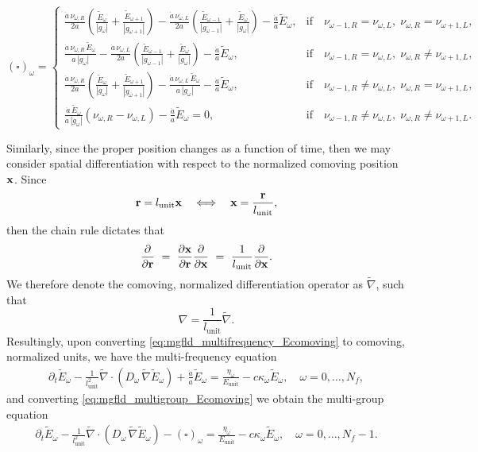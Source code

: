 \documentclass[10pt]{article}
\renewcommand{\(}{\left(}
\renewcommand{\)}{\right)}
\newcommand{\xvec}{{\bf x}}
\newcommand{\rvec}{{\bf r}}
\newcommand{\adot}{\dot{a}}
\newcommand{\Lunit}{l_{\text{unit}}}
\newcommand{\Eunit}{E_{\text{unit}}}
\newcommand{\tE}{\tilde{E}}
\newcommand{\tnabla}{\tilde{\nabla}}
\begin{document}
\begin{equation}
\label{eq:square_omega}
  (\square)_{\omega} = \begin{cases}
     \frac{\adot\, \nu_{\omega,R}}{2a}\left(\frac{\tE_{\omega}}{|g_{\omega}|} + \frac{\tE_{\omega+1}}{|g_{\omega+1}|}\right) -
      \frac{\adot\, \nu_{\omega,L}}{2a}\left(\frac{\tE_{\omega-1}}{|g_{\omega-1}|}+\frac{\tE_{\omega}}{|g_{\omega}|}\right) -
      \frac{\adot}{a}\tE_{\omega},&
      \text{if}\quad \nu_{\omega-1,R}=\nu_{\omega,L},\; \nu_{\omega,R}=\nu_{\omega+1,L},\\
     \frac{\adot\, \nu_{\omega,R}\, \tE_{\omega}}{a\, |g_{\omega}|} -
      \frac{\adot\, \nu_{\omega,L}}{2a}\left(\frac{\tE_{\omega-1}}{|g_{\omega-1}|}+\frac{\tE_{\omega}}{|g_{\omega}|}\right) -
      \frac{\adot}{a}\tE_{\omega},&
      \text{if}\quad \nu_{\omega-1,R}=\nu_{\omega,L},\; \nu_{\omega,R}\ne\nu_{\omega+1,L},\\
     \frac{\adot\, \nu_{\omega,R}}{2a}\left(\frac{\tE_{\omega}}{|g_{\omega}|} + \frac{\tE_{\omega+1}}{|g_{\omega+1}|}\right) -
      \frac{\adot\, \nu_{\omega,L}\, \tE_{\omega}}{a\, |g_{\omega}|} -
      \frac{\adot}{a}\tE_{\omega},&
      \text{if}\quad \nu_{\omega-1,R}\ne\nu_{\omega,L},\; \nu_{\omega,R}=\nu_{\omega+1,L},\\
     \frac{\adot\, \tE_{\omega}}{a\, |g_{\omega}|}\left(\nu_{\omega,R} - \nu_{\omega,L}\right) -
      \frac{\adot}{a}\tE_{\omega} = 0,&
      \text{if}\quad \nu_{\omega-1,R}\ne\nu_{\omega,L},\; \nu_{\omega,R}\ne\nu_{\omega+1,L}.
  \end{cases}
\end{equation}


Similarly, since the proper position changes as a function of time,
then we may consider spatial differentiation with respect to the
normalized comoving position $\xvec$.  Since 
\[
   \rvec = \Lunit \xvec \quad\Longleftrightarrow\quad
   \xvec = \frac{\rvec}{\Lunit},
\]
then the chain rule dictates that
\[
   \frac{\partial}{\partial \rvec} \ = \
   \frac{\partial \xvec}{\partial \rvec}
   \frac{\partial}{\partial \xvec} \ = \
   \frac{1}{\Lunit}\frac{\partial}{\partial \xvec}.
\]
We therefore denote the comoving, normalized differentiation operator
as $\tnabla$, such that 
\[
   \nabla = \frac{1}{\Lunit}\tnabla.
\]
Resultingly, upon converting \eqref{eq:mgfld_multifrequency_Ecomoving}
to comoving, normalized units, we have the multi-frequency equation
\begin{align}
  \label{eq:mgfld_multifrequency_comoving}
  \partial_{t} \tE_{\omega} - \frac{1}{\Lunit^2}\tnabla\cdot\(D_{\omega}\,\tnabla \tE_{\omega}\) + \frac{\adot}{a}\tE_{\omega}
    = \frac{\eta_{\omega}}{\Eunit} - c\kappa_{\omega} \tE_{\omega}, \quad \omega=0,\ldots,N_f,
\end{align}
and converting \eqref{eq:mgfld_multigroup_Ecomoving} we obtain the
multi-group equation 
\begin{align}
  \label{eq:mgfld_multigroup_comoving}
  \partial_{t} \tE_{\omega} - \frac{1}{\Lunit^2}\tnabla\cdot(D_{\omega}\,\tnabla \tE_{\omega}) -
    (\square)_{\omega} = \frac{\eta_{\omega}}{\Eunit} - c\kappa_{\omega} \tE_{\omega},
    \quad \omega=0,\ldots,N_f-1.
\end{align}
\end{document}
